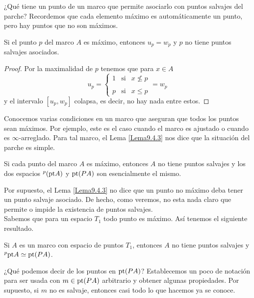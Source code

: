 ¿Qué tiene un punto de un marco que permite asociarlo con puntos salvajes del parche? Recordemos que cada elemento máximo es automáticamente un punto, pero hay puntos que no son máximos.

\begin{lem}\label{Lema9.4.3}
    Si el punto $p$ del marco $A$ es máximo, entonces $u_p=w_p$ y $p$ no tiene puntos salvajes asociados.
\end{lem}

\begin{proof}
    Por la maximalidad de $p$ tenemos que para $x\in A$
    \[
    u_p=\left\{ \begin{array}{lcc} 1 & \mbox{si} & x \nleq p\\ \\ 
    p & \mbox{si} & x\leq p  \end{array} \right.=w_p
    \]
    y el intervalo $[u_p, w_p]$ colapsa, es decir, no hay nada entre estos.
\end{proof}

Conocemos varias condiciones en un marco que aseguran que todos los puntos sean máximos. Por ejemplo, este es el caso cuando el marco es ajustado o cuando es $\infty$-arreglado. Para tal marco, el Lema \ref{Lema9.4.3} nos dice que la situación del parche es simple.

\begin{thm}\label{Teorema9.4.4}
    Si cada punto del marco $A$ es máximo, entonces $A$ no tiene puntos salvajes y los dos espacios $^p(\mathrm{pt} A)$ y $\mathrm{pt}(PA)$ son esencialmente el mismo.
\end{thm}

Por supuesto, el Lema \ref{Lema9.4.3} no dice que un punto no máximo deba tener un punto salvaje asociado. De hecho, como veremos, no esta nada claro que permite o impide la existencia de puntos salvajes.\\

Sabemos que para un espacio $T_1$ todo punto es máximo. Así tenemos el siguiente resultado.

\begin{cor}\label{Corolario9.4.5}
    Si $A$ es un marco con espacio de puntos $T_1$, entonces $A$ no tiene puntos salvajes y $^p\mathrm{pt} A\simeq \mathrm{pt} (PA)$.
\end{cor}

¿Qué podemos decir de los puntos en $\mathrm{pt}(PA)$? Establecemos un poco de notación para ser usada con $m\in \mathrm{pt}(PA)$ arbitrario y obtener algunas propiedades. Por supuesto, si $m$ no es salvaje, entonces casi todo lo que hacemos ya se conoce.\\

